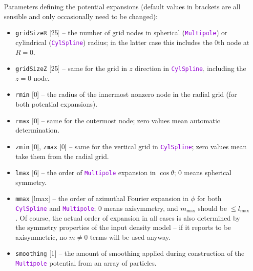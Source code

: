 \documentclass[12pt]{article}
\newcommand{\ttt}[1]{\textcolor{darkviolet}{\texttt{#1}}}
\newcommand{\ppp}[1]{\textcolor{darkolive} {\texttt{#1}}}
\begin{document}
Parameters defining the potential expansions (default values in brackets are all sensible and only occasionally need to be changed):
\begin{itemize}
\item \ppp{gridSizeR} [25] -- the number of grid nodes in spherical (\ttt{Multipole}) or cylindrical (\ttt{CylSpline}) radius; in the latter case this includes the 0th node at $R=0$. 
\item \ppp{gridSizeZ} [25] -- same for the grid in $z$ direction in \ttt{CylSpline}, including the $z=0$ node.
\item \ppp{rmin} [0] -- the radius of the innermost nonzero node in the radial grid (for both potential expansions).
\item \ppp{rmax} [0] -- same for the outermost node; zero values mean automatic determination.
\item \ppp{zmin} [0], \ppp{zmax} [0] -- same for the vertical grid in \ttt{CylSpline}; zero values mean take them from the radial grid.
\item \ppp{lmax} [6] -- the order of \ttt{Multipole} expansion in $\cos\theta$; 0 means spherical symmetry. 
\item \ppp{mmax} [lmax] -- the order of azimuthal Fourier expansion in $\phi$ for both  \ttt{CylSpline} and \ttt{Multipole}; 0 means axisymmetry, and $m_\mathrm{max}$ should be $\le l_\mathrm{max}$. Of course, the actual order of expansion in all cases is also determined by the symmetry properties of the input density model -- if it reports to be axisymmetric, no $m\ne 0$ terms will be used anyway.
\item \ppp{smoothing} [1] -- the amount of smoothing applied during construction of the \ttt{Multipole} potential from an array of particles.
\end{itemize}
\end{document}
